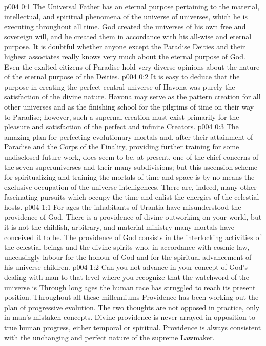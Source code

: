 \author{Divine Counsellor}
\vs p004 0:1 The Universal Father has an eternal purpose pertaining to the material, intellectual, and spiritual phenomena of the universe of universes, which he is executing throughout all time. God created the universes of his own free and sovereign will, and he created them in accordance with his all\hyp{}wise and eternal purpose. It is doubtful whether anyone except the Paradise Deities and their highest associates really knows very much about the eternal purpose of God. Even the exalted citizens of Paradise hold very diverse opinions about the nature of the eternal purpose of the Deities.
\vs p004 0:2 It is easy to deduce that the purpose in creating the perfect central universe of Havona was purely the satisfaction of the divine nature. Havona may serve as the pattern creation for all other universes and as the finishing school for the pilgrims of time on their way to Paradise; however, such a supernal creation must exist primarily for the pleasure and satisfaction of the perfect and infinite Creators.
\vs p004 0:3 The amazing plan for perfecting evolutionary mortals and, after their attainment of Paradise and the Corps of the Finality, providing further training for some undisclosed future work, does seem to be, at present, one of the chief concerns of the seven superuniverses and their many subdivisions; but this ascension scheme for spiritualizing and training the mortals of time and space is by no means the exclusive occupation of the universe intelligences. There are, indeed, many other fascinating pursuits which occupy the time and enlist the energies of the celestial hosts.
\vs p004 1:1 For ages the inhabitants of Urantia have misunderstood the providence of God. There is a providence of divine outworking on your world, but it is not the childish, arbitrary, and material ministry many mortals have conceived it to be. The providence of God consists in the interlocking activities of the celestial beings and the divine spirits who, in accordance with cosmic law, unceasingly labour for the honour of God and for the spiritual advancement of his universe children.
\vs p004 1:2 Can you not advance in your concept of God’s dealing with man to that level where you recognize that the watchword of the universe is  Through long ages the human race has struggled to reach its present position. Throughout all these millenniums Providence has been working out the plan of progressive evolution. The two thoughts are not opposed in practice, only in man’s mistaken concepts. Divine providence is never arrayed in opposition to true human progress, either temporal or spiritual. Providence is always consistent with the unchanging and perfect nature of the supreme Lawmaker.
